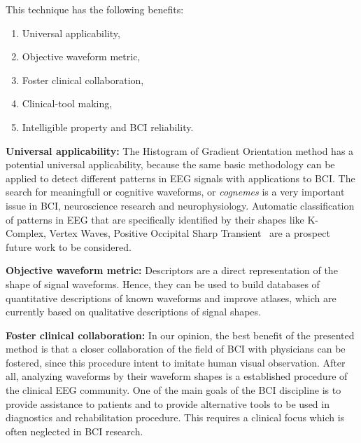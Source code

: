 

\vspace{5pt}

This technique has the following benefits:

\begin{enumerate}
\item Universal applicability,
\item Objective waveform metric,
\item Foster clinical collaboration,
\item Clinical-tool making,
\item Intelligible property and BCI reliability.
\end{enumerate}

\textbf{Universal applicability:}
The Histogram of Gradient Orientation method has a potential universal applicability, because the same basic methodology can be applied to detect different patterns in EEG signals with applications to BCI.   The search for meaningfull or cognitive waveforms, or \textit{cognemes} is a very important issue in BCI, neuroscience research and neurophysiology. Automatic classification of patterns in EEG that are specifically identified by their shapes like K-Complex, Vertex Waves, Positive Occipital Sharp Transient~\cite{Hartman2005} are a prospect future work to be considered. 


\textbf{Objective waveform metric:}
Descriptors are a direct representation of the shape of signal waveforms. Hence,  they can be used to build databases of quantitative descriptions of known waveforms and improve atlases, which are currently based on qualitative descriptions of signal shapes.

\textbf{Foster clinical collaboration:}
In our opinion, the best benefit of the presented method is that a closer collaboration of the field of BCI with physicians can be fostered, since this procedure intent to imitate human visual observation. After all, analyzing waveforms by their waveform shapes is a established procedure of the clinical EEG community. One of the main goals of the BCI discipline is to provide assistance to patients and to provide alternative tools to be used in diagnostics and rehabilitation procedure.  This requires a clinical focus which is often neglected in BCI research. 

